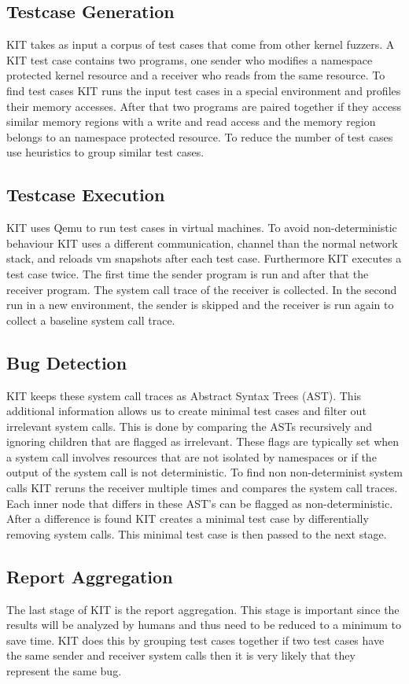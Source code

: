 \documentclass[10pt,twocolumn,a4paper]{article}
\begin{document}
\subsection{Testcase Generation}
KIT takes as input a corpus of test cases that come from other kernel fuzzers.
A KIT test case contains two programs, one sender who modifies a namespace protected kernel
resource and a receiver who reads from the same resource. To find test cases
KIT runs the input test cases in a special environment and profiles their memory accesses. 
After that two programs are paired together if they access similar memory regions with a write and
read access and the memory region belongs to an namespace protected resource.
To reduce the number of test cases use heuristics to group similar test cases.

\subsection{Testcase Execution}
KIT uses Qemu to run test cases in virtual machines. To avoid non-deterministic behaviour KIT uses
a different communication, channel than the normal network stack, and reloads vm snapshots after
each test case. Furthermore KIT  executes a
test case twice. The first time the sender program is run and after that the receiver program. The
system call trace of the receiver is collected. In the second run in a new environment, 
the sender is skipped and the receiver
is run again to collect a baseline system call trace\cite{0}. 
\subsection{Bug Detection}
KIT keeps these system call traces as Abstract Syntax Trees (AST). This additional information allows 
us to create minimal test cases and filter out irrelevant system calls. This is done by comparing the ASTs
recursively and ignoring children that are flagged as irrelevant. These flags are typically set when
a system call involves resources that are not isolated by namespaces or if the output of the
system call is not deterministic. To find non non-determinist system calls KIT  reruns the receiver multiple times and
compares the system call traces. Each inner node that differs in these AST's can be flagged as non-deterministic.
After a difference is found KIT creates a minimal test case by differentially removing system calls. This
minimal test case is then passed to the next stage\cite{0}.
\subsection{Report Aggregation}
The last stage of KIT is the report aggregation. This stage is important since the results will be
analyzed by humans and thus need to be reduced to a minimum to save time. KIT does this by grouping
test cases together if two test cases have the same sender and receiver system calls then it is very
likely that they represent the same bug\cite{0}. 
\end{document}
